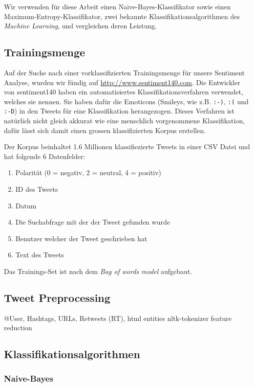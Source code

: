 \documentclass[12pt, oneside]{report}   	%
\begin{document}
Wir verwenden für diese Arbeit einen Naive-Bayes-Klassifikator sowie einen Maximum-Entropy-Klassifikator, zwei bekannte Klassifikationsalgorithmen des \emph{Machine Learning}, und vergleichen deren Leistung.


\subsection{Trainingsmenge}

Auf der Suche nach einer vorklassifizierten Trainingsmenge für unsere Sentiment Analyse, wurden wir fündig auf \url{http://www.sentiment140.com}. 
Die Entwickler von sentiment140 haben ein automatisiertes Klassifikationsverfahren verwendet, welches sie  nennen. 
Sie haben dafür die  Emoticons (Smileys, wie z.B. \verb|:-)|, \verb|:(| und \verb|:-D|) in den Tweets für eine Klassifikation herangezogen. 
Dieses Verfahren ist natürlich nicht gleich akkurat wie eine menschlich vorgenommene Klassifikation, dafür lässt sich damit einen grossen klassifizierten Korpus erstellen.

Der Korpus beinhaltet 1.6 Millionen klassifiezierte Tweets in einer CSV Datei und hat folgende 6 Datenfelder:
\begin{enumerate}
\item Polarität (0 = negativ, 2 = neutral, 4 = positiv)
\item ID des Tweets
\item Datum
\item Die Suchabfrage mit der der Tweet gefunden wurde
\item Benutzer welcher der Tweet geschrieben hat
\item Text des Tweets
\end{enumerate}

Das Trainings-Set ist nach dem \emph{Bag of words model} aufgebaut.


\subsection{Tweet Preprocessing}
@User, Hashtags, URLs, Retweets (RT), html entities
nltk-tokenizer
feature reduction

\subsection{Klassifikationsalgorithmen}
\subsubsection{Naive-Bayes}
\end{document}
